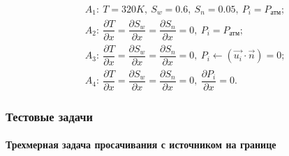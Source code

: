 \begin{frame}
\begin{center}
\begin{figure}
\begin{minipage}[h]{0.24\textwidth}
\end{minipage}
\hfill
\begin{minipage}[h]{0.75\textwidth}
 \begin{equation*}
  \begin{aligned}
    &A_1:\ T=320K,\ S_w=0.6,\ S_n=0.05,\ P_i=P_{\text{атм}};\\
    &A_2:\ \dfrac{\partial{T}}{\partial{x}}=\dfrac{\partial{S_w}}{\partial{x}}=\dfrac{\partial{S_n}}{\partial{x}}=0,\ {P_i}=P_{\text{атм}};\\
    &A_3:\ \dfrac{\partial{T}}{\partial{x}}=\dfrac{\partial{S_w}}{\partial{x}}=\dfrac{\partial{S_n}}{\partial{x}}=0,\ P_i\leftarrow(\overrightarrow{u_i} \cdot \overrightarrow{n})=0;\\
    &A_4:\ \dfrac{\partial{T}}{\partial{x}}=\dfrac{\partial{S_w}}{\partial{x}}=\dfrac{\partial{S_n}}{\partial{x}}=0,\ \dfrac{\partial{P_i}}{\partial{x}}=0.
  \end{aligned}
 \end{equation*}
\end{minipage}
\end{figure}
\end{center}
\end{frame}


\begin{frame}
\frametitle{Тестовые задачи}
\framesubtitle{Трехмерная задача просачивания с источником на границе}
\begin{center}
\begin{figure}
\end{figure}
  \end{center}
\end{frame}

